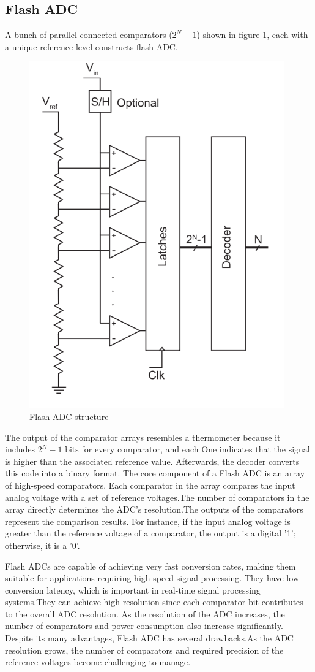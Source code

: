 \subsection{Flash ADC}
A bunch of parallel connected comparators ($2^N-1$) shown in figure \ref{fig:x Flash ADC}, each with a unique reference level constructs flash ADC.
\begin{figure}[htbp]
\centering
\includegraphics[scale=0.6]{images/Flash.PNG}
\caption{Flash ADC structure}
\label{fig:x Flash ADC}
\end{figure}
The output of the comparator arrays resembles a thermometer because it includes $2^N-1$ bits for every comparator, and each One indicates that the signal is higher than the associated reference value. Afterwards, the decoder converts this code into a binary format. The core component of a Flash ADC is an array of high-speed comparators. Each comparator in the array compares the input analog voltage with a set of reference voltages.The number of comparators in the array directly determines the ADC's resolution.The outputs of the comparators represent the comparison results. For instance, if the input analog voltage is greater than the reference voltage of a comparator, the output is a digital '1'; otherwise, it is a '0'.
\vspace{1\baselineskip}\par 
Flash ADCs are capable of achieving very fast conversion rates, making them suitable for applications requiring high-speed signal processing. They have low conversion latency, which is important in real-time signal processing systems.They can achieve high resolution since each comparator bit contributes to the overall ADC resolution. As the resolution of the ADC increases, the number of comparators and power consumption also increase significantly. Despite its many advantages, Flash ADC has several drawbacks.As the ADC resolution grows, the number of comparators and required precision of the reference voltages become challenging to manage.
